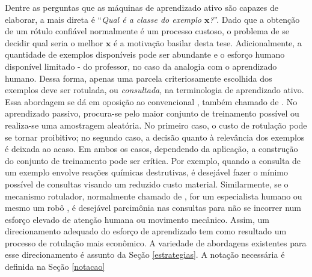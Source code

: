 Dentre as perguntas que as máquinas de aprendizado ativo são capazes de
elaborar, a mais direta é ``\textit{Qual é a classe do exemplo $\bm{x}$?}''.
Dado que a obtenção de um rótulo confiável normalmente é um processo custoso,
o problema de se decidir qual seria o melhor $\bm{x}$ é a
motivação basilar desta tese.
Adicionalmente,
a quantidade de exemplos disponíveis pode ser abundante e o esforço humano disponível limitado -
do professor, no caso da analogia com o aprendizado humano.
Dessa forma, apenas uma parcela criteriosamente escolhida dos exemplos deve
ser rotulada, ou \textit{consultada}, na terminologia de aprendizado ativo.
Essa abordagem se dá em oposição ao
 convencional
\citep{journals/cacm/Valiant84}, também chamado de .
No aprendizado passivo,
procura-se pelo maior conjunto de treinamento possível ou realiza-se
uma amostragem aleatória.
No primeiro caso, o custo de rotulação pode se tornar proibitivo; no segundo caso,
a decisão quanto à relevância dos exemplos é deixada ao acaso.
Em ambos os casos, dependendo da aplicação,
a construção do conjunto de treinamento pode ser crítica.
Por exemplo, quando a consulta de um exemplo envolve reações químicas
destrutivas, é desejável fazer o mínimo possível de consultas visando um reduzido
custo material.
Similarmente, se o mecanismo rotulador, normalmente chamado de ,
for um especialista humano ou mesmo um robô \citep{journals/etai/BryantMOKRK01},
é desejável parcimônia nas consultas para não se incorrer num esforço elevado de
atenção humana ou movimento mecânico.
Assim, um direcionamento adequado do esforço de aprendizado tem como resultado um
processo de rotulação mais econômico.
A variedade de abordagens existentes para esse direcionamento é assunto da
Seção \ref{estrategias}.
A notação necessária é definida na Seção \ref{notacao}



